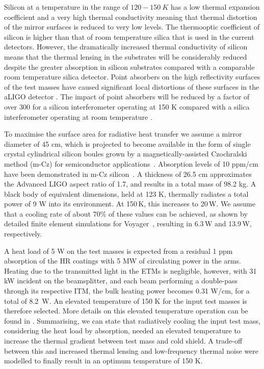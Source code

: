 \documentclass[prx,superscriptaddress,twocolumn,nopreprintnumbers,floatfix,nofootinbib]{revtex4}
\begin{document}
Silicon at a temperature in the range of $120-150~K$ has a low thermal expansion coefficient and a very high thermal conductivity meaning that thermal distortion of the mirror surfaces is reduced to very low levels. The thermooptic coefficient of silicon is higher than that of room temperature silica that is used in the current detectors. However, the dramatically increased thermal conductivity of silicon means that the thermal lensing in the substrates will be considerably reduced despite the greater absorption in silicon substrates compared with a comparable room temperature silica detector. Point absorbers on the high reflectivity surfaces of the test masses have caused significant local distortions of these surfaces in the aLIGO detector \cite{LIGO_O3_DET}. The impact of point absorbers will be reduced by a factor of over 300 for a silicon interferometer operating at 150 K compared with a silica interferometer operating at room temperature \cite{Eichholz2020}.

To maximise the surface area for radiative heat transfer we assume a mirror diameter of 45 cm, which is projected to become available in the form of single crystal cylindrical silicon boules grown by a magnetically-assisted Czochralski method (m-Cz) for semiconductor applications~\cite{lin2008_silicon}. Absorption levels of 10 ppm/cm have been demonstrated in m-Cz silicon~\cite{voyager-arxiv}. A thickness of 26.5 cm approximates the Advanced LIGO aspect ratio of 1.7, and results in a total mass of 98.2 kg. A black body of equivalent dimensions, held at 123 K, thermally radiates a total power of 9 W into its environment. At 150\,K, this increases to 20\,W. We assume that a cooling rate of about 70\% of these values can be achieved, as shown by detailed finite element simulations for Voyager~\cite{voyager-arxiv}, resulting in 6.3\,W and 13.9\,W, respectively.

A heat load of 5 W on the test masses is expected from a residual 1 ppm absorption of the HR coatings with 5 MW of circulating power in the arms. Heating due to the transmitted light in the ETMs is negligible, however, with 31 kW incident on the beamsplitter, and each beam performing a double-pass through its respective ITM, the bulk heating power becomes 0.31 W/cm, for a total of 8.2~W. An elevated temperature of 150 K for the input test masses is therefore selected. More details on this elevated temperature operation can be found in \cite{Eichholz2020}. Summarising, we can state that radiatively cooling the input test mass, considering the heat load by absorption, needed an elevated temperature to increase the thermal gradient between test mass and cold shield. A trade-off between this and increased thermal lensing and low-frequency thermal noise were modelled to finally result in an optimum temperature of 150 K. 
\end{document}

